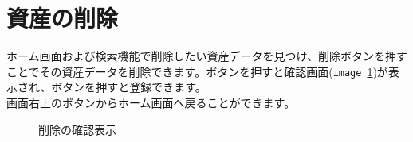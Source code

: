 \documentclass[11ptm]{jsarticle}
\begin{document}
\clearpage
\section{資産の削除}
\label{sec:資産の削除}
ホーム画面および検索機能で削除したい資産データを見つけ、削除ボタンを押すことでその資産データを削除できます。ボタンを押すと確認画面({\tt image}\ \ref{fig:削除の確認表示})が表示され、ボタンを押すと登録できます。\\
画面右上のボタンからホーム画面へ戻ることができます。
\begin{figure}[h]
  \centering
  \caption{\label{fig:削除の確認表示}削除の確認表示}
\end{figure}

\end{document}
